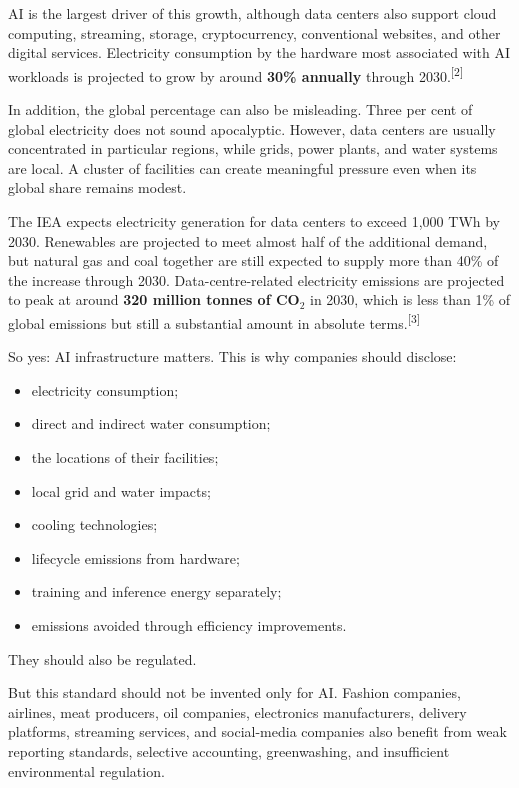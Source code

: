 \documentclass{article}
\begin{document}
AI is the largest driver of this growth, although data centers also support cloud computing, streaming, storage, cryptocurrency, conventional websites, and other digital services. Electricity consumption by the hardware most associated with AI workloads is projected to grow by around \textbf{30\% annually} through 2030.\textsuperscript{[2]}

In addition, the global percentage can also be misleading. Three per cent of global electricity does not sound apocalyptic. However, data centers are usually concentrated in particular regions, while grids, power plants, and water systems are local. A cluster of facilities can create meaningful pressure even when its global share remains modest.

The IEA expects electricity generation for data centers to exceed 1,000 TWh by 2030. Renewables are projected to meet almost half of the additional demand, but natural gas and coal together are still expected to supply more than 40\% of the increase through 2030. Data-centre-related electricity emissions are projected to peak at around \textbf{320 million tonnes of CO$_2$} in 2030, which is less than 1\% of global emissions but still a substantial amount in absolute terms.\textsuperscript{[3]}

So yes: AI infrastructure matters. This is why companies should disclose:

\begin{itemize}[noitemsep]
    \item electricity consumption;
    \item direct and indirect water consumption;
    \item the locations of their facilities;
    \item local grid and water impacts;
    \item cooling technologies;
    \item lifecycle emissions from hardware;
    \item training and inference energy separately;
    \item emissions avoided through efficiency improvements.
\end{itemize}

They should also be regulated.

But this standard should not be invented only for AI. Fashion companies, airlines, meat producers, oil companies, electronics manufacturers, delivery platforms, streaming services, and social-media companies also benefit from weak reporting standards, selective accounting, greenwashing, and insufficient environmental regulation.
\end{document}
